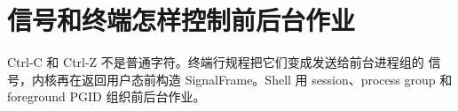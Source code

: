 \chapter{信号和终端怎样控制前后台作业}

Ctrl-C 和 Ctrl-Z 不是普通字符。终端行规程把它们变成发送给前台进程组的
信号，内核再在返回用户态前构造 SignalFrame。Shell 用 session、process
group 和 foreground PGID 组织前后台作业。




